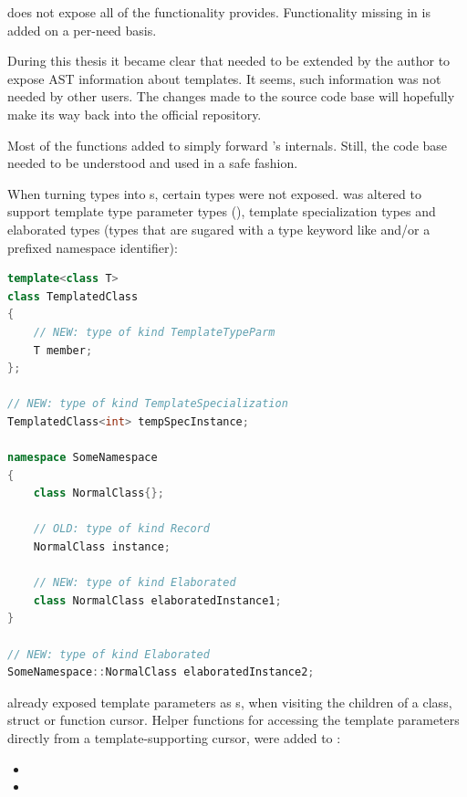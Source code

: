 does not expose all of the functionality  provides. Functionality missing in  is added on a per-need basis. 

During this thesis it became clear that  needed to be extended by the author to expose AST information about  templates. It seems, such information was not needed by other  users. The changes made to the  source code base will hopefully make its way back into the official  repository.

Most of the functions added to  simply forward 's internals. Still, the  code base needed to be understood and used in a safe  fashion.

When turning  types into s, certain  types were not exposed.  was altered to support template type parameter types (), template specialization types and elaborated types (types that are sugared with a type keyword like  and/or a prefixed namespace identifier):

\SingleSpacing
\begin{lstlisting}[language=C++, caption=Examples of types now supported by \myProperName{libclang}]
template<class T>
class TemplatedClass
{
	// NEW: type of kind TemplateTypeParm
	T member; 
};

// NEW: type of kind TemplateSpecialization
TemplatedClass<int> tempSpecInstance; 

namespace SomeNamespace
{	
	class NormalClass{};
	
	// OLD: type of kind Record
	NormalClass instance;
	
	// NEW: type of kind Elaborated
	class NormalClass elaboratedInstance1;
}

// NEW: type of kind Elaborated
SomeNamespace::NormalClass elaboratedInstance2; 
\end{lstlisting}
\OnehalfSpacing

 already exposed template parameters as s, when visiting the children of a class, struct or function cursor. Helper functions for accessing the template parameters directly from a template-supporting cursor, were added to :

\begin{itemize}\addtolength{\itemsep}{-0.5\baselineskip}
\item {}
\item {}
\end{itemize}

